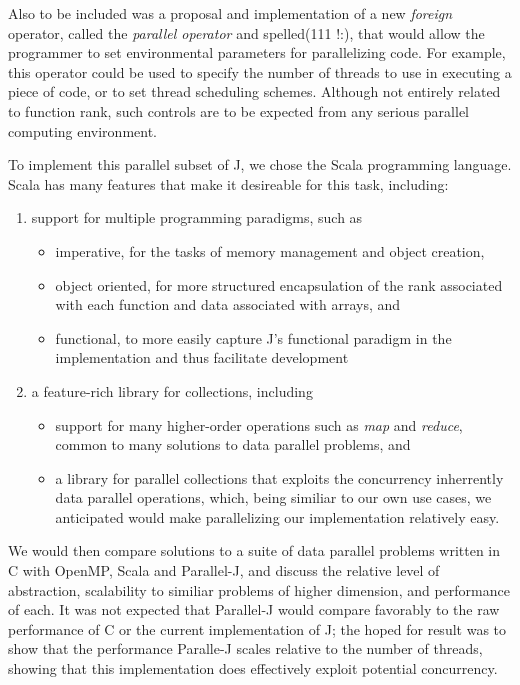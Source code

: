 Also to be included was a proposal and implementation of a new \textit{foreign} operator, called the \textit{parallel operator} and spelled\ttfamily (111 !:)\normalfont , 
that would allow the programmer to set environmental parameters for parallelizing code.
For example, this operator could be used to specify the number of threads to use in executing a piece of code, 
or to set thread scheduling schemes.
Although not entirely related to function rank, such controls are to be expected from any serious parallel computing environment.

To implement this parallel subset of J, we chose the Scala programming language.\cite{scala} 
Scala has many features that make it desireable for this task, including: 
\begin{enumerate} 
	\item support for multiple programming paradigms, such as
	\begin{itemize}
		\item imperative, for the tasks of memory management and object creation,
		\item object oriented, for more structured encapsulation of the rank associated with each function 
			and data associated with arrays, and
		\item functional, to more easily capture J's functional paradigm in the implementation and thus facilitate development
	\end{itemize}
	\item a feature-rich library for collections, including 
	\begin{itemize}
		\item support for many higher-order operations such as \textit{map} and \textit{reduce}, \cite{scala28col}
			common to many solutions to data parallel problems, and
		\item a library for parallel collections that exploits the concurrency inherrently data parallel operations,\cite{pc}
			which, being similiar to our own use cases, we anticipated would make parallelizing our implementation relatively easy.
	\end{itemize}
\end{enumerate}

We would then compare solutions to a suite of data parallel problems written in C with OpenMP, Scala and Parallel-J,
and discuss the relative level of abstraction, scalability to similiar problems of higher dimension, and performance of each. 
It was not expected that Parallel-J would compare favorably to the raw performance of C or the current implementation of J; 
the hoped for result was to show that the performance Paralle-J scales relative to the number of threads, 
showing that this implementation does effectively exploit potential concurrency.

